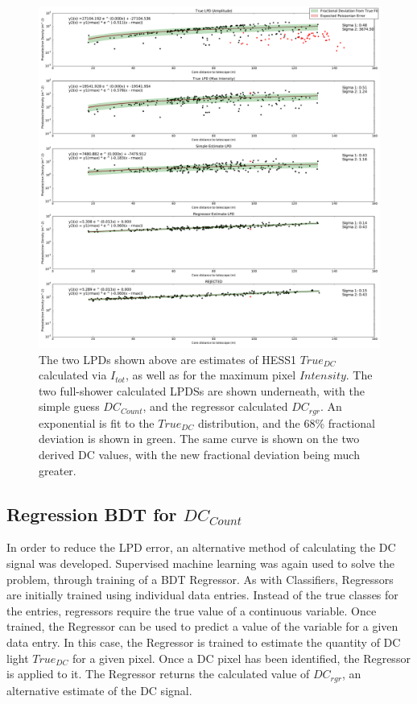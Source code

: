 \documentclass[11pt]{article}
\begin{document}
\begin{figure}
\begin{center}
\includegraphics[width=\textwidth]{corsikalpd1}
\caption{The two LPDs shown above are estimates of HESS1 $True_{DC}$ calculated via $I_{tot}$, as well as for the maximum pixel $Intensity$. The two full-shower calculated LPDSs are shown underneath, with the simple guess $DC_{Count}$, and the regressor calculated $DC_{rgr}$. An exponential is fit to the $True_{DC}$ distribution, and the 68\% fractional deviation is shown in green. The same curve is shown on the two derived DC values, with the new fractional deviation being much greater.}
\label{fig:corsikalpd1}
\end{center}
\end{figure}

\subsection{Regression BDT for $DC_{Count}$}
In order to reduce the LPD error, an alternative method of calculating the DC signal was developed. Supervised machine learning was again used to solve the problem, through training of a BDT Regressor. As with Classifiers, Regressors are initially trained using individual data entries. Instead of the true classes for the entries, regressors require the true value of a continuous variable. Once trained, the Regressor can be used to predict a value of the variable for a given data entry. In this case, the Regressor is trained to estimate the quantity of DC light $True_{DC}$ for a given pixel. Once a DC pixel has been identified, the Regressor is applied to it. The Regressor returns the calculated value of $DC_{rgr}$, an alternative estimate of the DC signal. 
\end{document}
